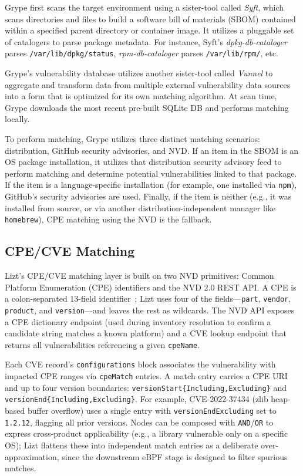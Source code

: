 \documentclass[conference]{IEEEtran}
\begin{document}
Grype first scans the target environment using a sister-tool called \textit{Syft}, which scans directories and files to build a software bill of materials (SBOM) contained within a specified parent directory or container image. It utilizes a pluggable set of catalogers to parse package metadata. For instance, Syft's \textit{dpkg-db-cataloger} parses \texttt{/var/lib/dpkg/status}, \textit{rpm-db-cataloger} parses \texttt{/var/lib/rpm/}, etc.

Grype's vulnerability database utilizes another sister-tool called \textit{Vunnel} to aggregate and transform data from multiple external vulnerability data sources into a form that is optimized for its own matching algorithm. At scan time, Grype downloads the most recent pre-built SQLite DB and performs matching locally.

To perform matching, Grype utilizes three distinct matching scenarios: distribution, GitHub security advisories, and NVD. If an item in the SBOM is an OS package installation, it utilizes that distribution security advisory feed to perform matching and determine potential vulnerabilities linked to that package. If the item is a language-specific installation (for example, one installed via \texttt{npm}), GitHub's security advisories are used. Finally, if the item is neither (e.g., it was installed from source, or via another distribution-independent manager like \texttt{homebrew}), CPE matching using the NVD is the fallback.

\subsection{CPE/CVE Matching}

Lizt's CPE/CVE matching layer is built on two NVD primitives: Common Platform Enumeration (CPE) identifiers and the NVD 2.0 REST API. A CPE is a colon-separated 13-field identifier~\cite{cpe_spec}; Lizt uses four of the fields---\texttt{part}, \texttt{vendor}, \texttt{product}, and \texttt{version}---and leaves the rest as wildcards. The NVD API exposes a CPE dictionary endpoint (used during inventory resolution to confirm a candidate string matches a known platform) and a CVE lookup endpoint that returns all vulnerabilities referencing a given \texttt{cpeName}.

Each CVE record's \texttt{configurations} block associates the vulnerability with impacted CPE ranges via \texttt{cpeMatch} entries. A match entry carries a CPE URI and up to four version boundaries: \texttt{versionStart\{Including,Excluding\}} and \texttt{versionEnd\{Including,Excluding\}}. For example, CVE-2022-37434 (zlib heap-based buffer overflow) uses a single entry with \texttt{versionEndExcluding} set to \texttt{1.2.12}, flagging all prior versions. Nodes can be composed with \texttt{AND}/\texttt{OR} to express cross-product applicability (e.g., a library vulnerable only on a specific OS); Lizt flattens these into independent match entries as a deliberate over-approximation, since the downstream eBPF stage is designed to filter spurious matches.
\end{document}
